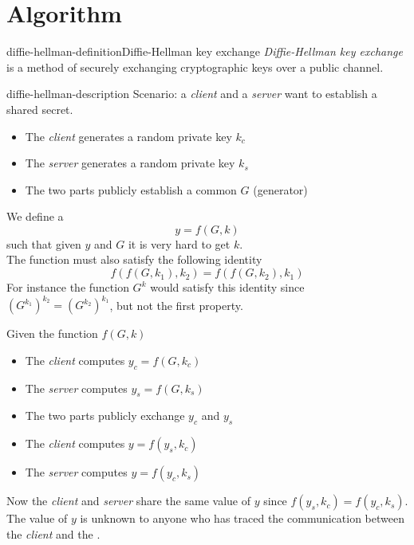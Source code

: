 \documentclass[preview]{standalone}
\begin{document}
\genpage

\section{Algorithm}

\begin{snippetdefinition}{diffie-hellman-definition}{Diffie-Hellman key exchange}
    \textit{Diffie-Hellman key exchange} is a method of securely exchanging
    cryptographic keys over a public channel.
\end{snippetdefinition}

\begin{snippet}{diffie-hellman-description}
Scenario: a \textit{client} and a \textit{server} want to establish a shared secret.
\begin{itemize}
	\item The \textit{client} generates a random private key \(k_c\)
	\item The \textit{server} generates a random private key \(k_s\)
	\item The two parts publicly establish a common \(G\) (generator)
\end{itemize}

We define a \function
\[
	y=f(G,k)
\]
such that given \(y\) and \(G\) it is very hard to get \(k\).\\
The function must also satisfy the following identity
\[
	f(f(G, k_1), k_2)=f(f(G, k_2), k_1)
\]
For instance the function \(G^k\) would satisfy this identity since \({\left(G^{k_1}\right)}^{k_2}={\left(G^{k_2}\right)}^{k_1}\), but not the first property.

Given the function \(f(G,k)\)
\begin{itemize}
	\item The \textit{client} computes \(y_c=f(G,k_c)\)
	\item The \textit{server} computes \(y_s=f(G,k_s)\)
	\item The two parts publicly exchange \(y_c\) and \(y_s\)
	\item The \textit{client} computes \(y=f(y_s,k_c)\)
	\item The \textit{server} computes \(y=f(y_c,k_s)\)
\end{itemize}
Now the \textit{client} and \textit{server} share the same value of \(y\) since \(f(y_s,k_c)=f(y_c,k_s)\).\\
The value of \(y\) is unknown to anyone who has traced the communication between the \textit{client} and the .
\end{snippet}
\end{document}
